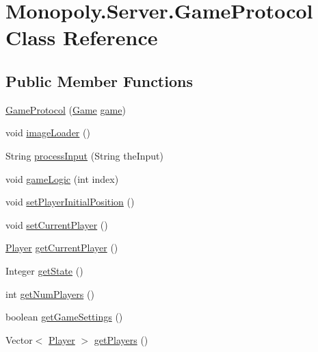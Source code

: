 \hypertarget{class_monopoly_1_1_server_1_1_game_protocol}{}\section{Monopoly.\+Server.\+Game\+Protocol Class Reference}
\label{class_monopoly_1_1_server_1_1_game_protocol}
\subsection*{Public Member Functions}
\begin{DoxyCompactItemize}
\item 
\hyperlink{class_monopoly_1_1_server_1_1_game_protocol_af8d2e046f5e5a11799d8379361689584}{Game\+Protocol} (\hyperlink{class_monopoly_1_1_logic_1_1_game}{Game} \hyperlink{class_monopoly_1_1_server_1_1_game_protocol_a2496f74982ea2cc8730f1871c1406542}{game})
\item 
void \hyperlink{class_monopoly_1_1_server_1_1_game_protocol_a7eb5fc495b0d5f489d510d59b0d5dc3e}{image\+Loader} ()
\item 
String \hyperlink{class_monopoly_1_1_server_1_1_game_protocol_ac145ed5c76fbff79218a9d9c6ced0698}{process\+Input} (String the\+Input)
\item 
void \hyperlink{class_monopoly_1_1_server_1_1_game_protocol_abca495ebc2303b356ff7306c8a26e912}{game\+Logic} (int index)
\item 
void \hyperlink{class_monopoly_1_1_server_1_1_game_protocol_a5ae979d6407a7fec6398adff226b3dbc}{set\+Player\+Initial\+Position} ()
\item 
void \hyperlink{class_monopoly_1_1_server_1_1_game_protocol_aeaf65570f6c47d7028c195a856905508}{set\+Current\+Player} ()
\item 
\hyperlink{class_monopoly_1_1_logic_1_1_player}{Player} \hyperlink{class_monopoly_1_1_server_1_1_game_protocol_aba65994f64b948eb5dff1e4eebc93367}{get\+Current\+Player} ()
\item 
Integer \hyperlink{class_monopoly_1_1_server_1_1_game_protocol_aa2af1d78e88ffd885ea18b67b82d2be7}{get\+State} ()
\item 
int \hyperlink{class_monopoly_1_1_server_1_1_game_protocol_a6ca7ecbc46e3175d612ee66014f03ecd}{get\+Num\+Players} ()
\item 
boolean \hyperlink{class_monopoly_1_1_server_1_1_game_protocol_a4ec6d4ea15af4195decd7b0db1e545d9}{get\+Game\+Settings} ()
\item 
Vector$<$ \hyperlink{class_monopoly_1_1_logic_1_1_player}{Player} $>$ \hyperlink{class_monopoly_1_1_server_1_1_game_protocol_a56346961e961b9ee763e3ffacfc37b48}{get\+Players} ()
\end{DoxyCompactItemize}

